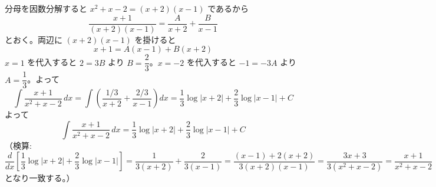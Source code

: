 
分母を因数分解すると $x^{2}+x-2 = (x+2)(x-1)$ であるから
\[
\frac{x+1}{(x+2)(x-1)} = \frac{A}{x+2} + \frac{B}{x-1}
\]
とおく。両辺に $(x+2)(x-1)$ を掛けると
\[
x+1 = A(x-1) + B(x+2)
\]
$x=1$ を代入すると $2 = 3B$ より $B = \dfrac{2}{3}$。$x=-2$ を代入すると $-1 = -3A$ より $A = \dfrac{1}{3}$。よって
\[
\int \frac{x+1}{x^{2}+x-2}\, dx = \int \left(\frac{1/3}{x+2} + \frac{2/3}{x-1}\right) dx = \frac{1}{3}\log|x+2| + \frac{2}{3}\log|x-1| + C
\]
よって
\[
\boxed{\; \int \frac{x+1}{x^{2}+x-2}\, dx = \frac{1}{3}\log|x+2| + \frac{2}{3}\log|x-1| + C \;}
\]
（検算: $\dfrac{d}{dx}\left[\dfrac{1}{3}\log|x+2| + \dfrac{2}{3}\log|x-1|\right] = \dfrac{1}{3(x+2)} + \dfrac{2}{3(x-1)} = \dfrac{(x-1) + 2(x+2)}{3(x+2)(x-1)} = \dfrac{3x+3}{3(x^{2}+x-2)} = \dfrac{x+1}{x^{2}+x-2}$ となり一致する。）
